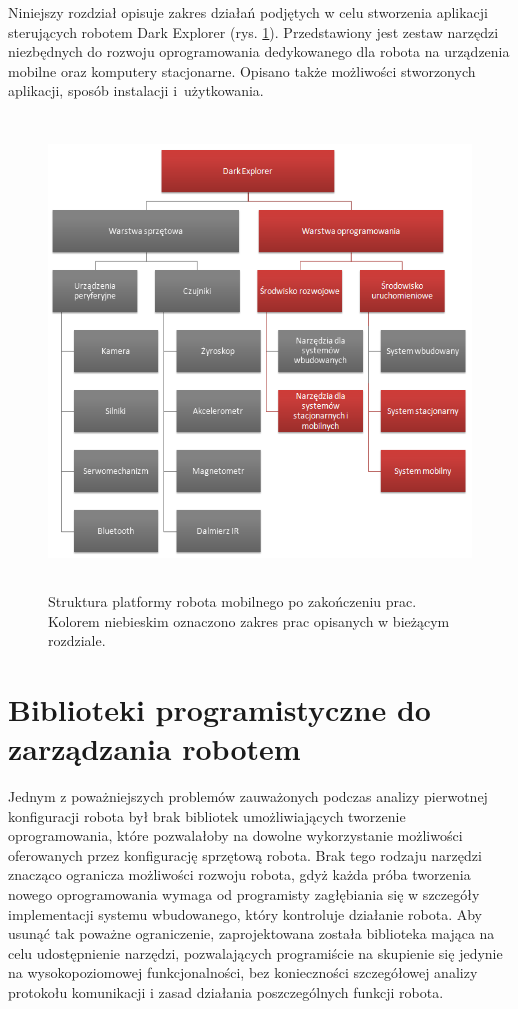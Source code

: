 Niniejszy rozdział opisuje zakres działań podjętych w celu stworzenia aplikacji
sterujących robotem Dark Explorer (rys. \ref{fig:DarkExplorerPlatformStacMob}). Przedstawiony jest
zestaw narzędzi niezbędnych do rozwoju oprogramowania dedykowanego dla robota na urządzenia mobilne oraz
komputery stacjonarne. Opisano także możliwości stworzonych aplikacji, sposób
instalacji i~użytkowania.

\begin{figure}[!ht]
 \centering
 \includegraphics[height=125mm]{../images/ch03/dark_explorer_platform_ide_stac_mob.png}
 \caption{Struktura platformy robota mobilnego po zakończeniu prac. Kolorem
 niebieskim oznaczono zakres prac opisanych w bieżącym rozdziale.}
 \label{fig:DarkExplorerPlatformStacMob}
\end{figure}

\section{Biblioteki programistyczne do zarządzania robotem}
Jednym z poważniejszych problemów zauważonych podczas analizy pierwotnej
konfiguracji robota był brak bibliotek umożliwiających tworzenie oprogramowania,
które pozwalałoby na dowolne wykorzystanie możliwości oferowanych przez
konfigurację sprzętową robota. Brak tego rodzaju narzędzi znacząco ogranicza
możliwości rozwoju robota, gdyż każda próba tworzenia nowego oprogramowania wymaga
od programisty zagłębiania się w szczegóły implementacji systemu wbudowanego,
który kontroluje działanie robota. Aby usunąć tak poważne ograniczenie,
zaprojektowana została biblioteka mająca na celu udostępnienie narzędzi,
pozwalających programiście na skupienie się jedynie na wysokopoziomowej
funkcjonalności, bez konieczności szczegółowej analizy protokołu komunikacji i
zasad działania poszczególnych funkcji robota.

